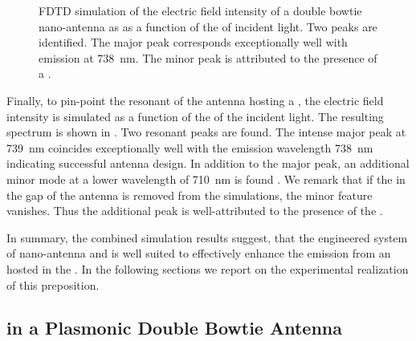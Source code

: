 		\begin{figure}[!htb]
				\centering
			\caption[Simulation of the resonance spectrum of a double bowtie antenna]{FDTD simulation of the electric field intensity of a double bowtie nano-antenna as as a function of the \wl of incident light. Two peaks are identified. The major peak corresponds exceptionally well with \siv emission at \SI{738}{nm}. The minor peak is attributed to the presence of a \nd \cite{Rahbany2015}.}
			\label{fig::antenna_fdtd_spectrum}
		\end{figure}

		Finally, to pin-point the resonant \wl of the antenna hosting a \nd, the electric field intensity is simulated as a function of the \wl of the incident light. The resulting spectrum is shown in . Two resonant peaks are found. The intense major peak at \SI{739}{nm} coincides exceptionally well with the \siv emission wavelength \SI{738}{nm} indicating successful antenna design. In addition to the major peak, an additional minor mode at a lower wavelength of \SI{710}{nm} is found \cite{rahbany2016towards}. We remark that if the \nd in the gap of the antenna is removed from the simulations, the minor feature vanishes. Thus the additional peak is well-attributed to the presence of the \nd.
		
		In summary, the combined simulation results suggest, that the engineered system of nano-antenna and \nd is well suited to effectively enhance the emission from an \siv hosted in the \nd. In the following sections we report on the experimental realization of this preposition.

	\subsection{\SIV in a Plasmonic Double Bowtie Antenna}

